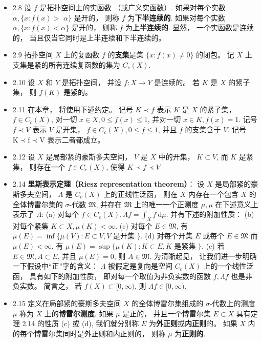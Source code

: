 \begin{itemize}
\item 2.8 设 $f$ 是拓扑空间上的实函数 （或广义实函数）. 如果对每个实数 $\alpha,\{x: f(x)>$ $\alpha\}$ 是开的， 则称 $f$ 为\textbf{下半连续的}. 如果对每个实数 $\alpha,\{x: f(x)<\alpha\}$ 是开的， 则称 $f$ 为\textbf{上半连续的}. 显然， 一个实函数是连续的， 当且仅当它同时是上半连续和下半连续的。

\item 2.9 拓扑空间 $X$ 上的复函数 $f$ 的\textbf{支集}是集 $\{x: f(x) \neq 0\}$ 的闭包。 记 $X$ 上支集是紧的所有连续复函数的集为 $C_{c}(X)$.

\item 2.10 设 $X$ 和 $Y$ 是拓扑空间， 并设 $f: X \rightarrow Y$ 是连续的。 若 $K$ 是 $X$ 的紧子集， 则 $f(K)$ 是紧的。

\item 2.11 在本章， 将使用下述约定。 记号 $K \prec f$ 表示 $K$ 是 $X$ 的紧子集， $f \in C_{c}(X)$, 对一切 $x \in X, 0 \leqslant f(x) \leqslant 1$, 并对一切 $x \in K, f(x)=1$. 记号 $f \prec V$ 表示 $V$ 是开集， $f \in C_{c}(X), 0 \leqslant f \leqslant 1$, 并且 $f$ 的支集含于 $V$. 记号 $\mathrm{K}\prec\mathrm{f}\prec\mathrm{V}$ 表示二者都成立。

\item 2.12 设 $X$ 是局部紧的豪斯多夫空间， $V$ 是 $X$ 中的开集， $K \subset V$, 而 $K$ 是紧集， 则存在一个 $f \in C_{c}(X)$, 使得 $K \prec f \prec V$

\item 2.14 \textbf{里斯表示定理（Riesz representation theorem）}： 设 $X$ 是局部紧的豪斯多夫空间， $\Lambda$ 是 $C_{c}(X)$ 上的正线性泛函， 则在 $X$ 内存在一个包含 $X$ 的全体博雷尔集的 $\sigma$-代数 $\mathfrak{M}$, 并存在 $\mathfrak{M}$ 上的唯一一个正测度 $\mu, \mu$ 在下述意义上表示了 $\Lambda$: 
(a) 对每个 $f \in C_{c}(X), \Lambda f=\int_{X} f \mathrm{~d} \mu$.
并有下述的附加性质：
(b) 对每个紧集 $K \subset X, \mu(K)<\infty$.
(c) 对每个 $E \in \mathfrak{M}$, 有 $\mu(E)=\inf \{\mu(V): E \subset V, V$ 是开集 $\} .$
(d) 对每个开集 $E$ 或每个 $E \in \mathfrak{M}$ 而 $\mu(E)<\infty$, 有 $\mu(E)=\sup \{\mu(K): K \subset E, K$ 是紧集 $\} .$
(e) 若 $E \in \mathfrak{M}, A \subset E$, 并且 $\mu(E)=0$, 则 $A \in \mathfrak{M}$.
为清晣起见， 让我们进一步明确一下假设中“正”字的含义： $\Lambda$ 被假定是复向是空间 $C_{c}(X)$ 上的一个线性泛函， 具有如下的附加性质， 即对每一个取值为非负实数的函数 $f, \Lambda f$ 也是非负实数。 简言之， 若 $f(X) \subset[0, \infty)$, 则 $\Lambda f \in[0, \infty)$.

\item 2.15 定义在局部紧的豪斯多夫空间 $X$ 的全体博雷尔集组成的 $\sigma$-代数上的测度 $\mu$ 称为 $X$ 上的\textbf{博雷尔测度}. 如果 $\mu$ 是正的， 并且一个博雷尔集 $E \subset X$ 具有定理 2.14 的性质 (c) 或 (d), 我们就分别称 $E$ 为\textbf{外正则}或\textbf{内正则}的。 如果 $X$ 内的每个博雷尔集同时是外正则和内正则的， 则称 $\mu$ 为\textbf{正则的}.


\end{itemize}
